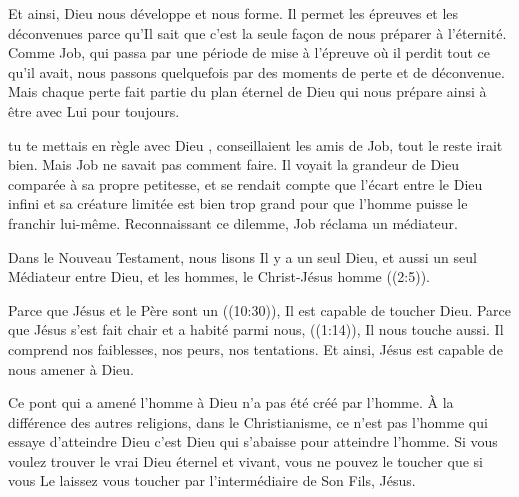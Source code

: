 Et ainsi, Dieu nous développe et nous forme.
 Il permet les épreuves et les déconvenues parce qu'Il sait
 que c'est la seule façon de nous préparer à l'éternité.
 Comme Job, qui passa par une période de mise à l'épreuve
 où il perdit tout ce qu'il avait, nous passons quelquefois
 par des moments de perte et de déconvenue.
 Mais chaque perte fait partie du plan éternel de Dieu
 qui nous prépare ainsi à être avec Lui pour toujours. 

\dvrule






 tu te mettais en règle avec Dieu \fg{},
 conseillaient les amis de Job, \og tout le reste irait bien. \fg{}
 Mais Job ne savait pas comment faire.
 Il voyait la grandeur de Dieu comparée à sa propre petitesse,
 et se rendait compte que l'écart entre le Dieu infini
 et sa créature limitée est bien trop grand pour que l'homme
 puisse le franchir lui-même.
 Reconnaissant ce dilemme, Job réclama un médiateur.

Dans le Nouveau Testament, nous lisons \og Il y a un seul Dieu,
 et aussi un seul Médiateur entre Dieu, et les hommes,
 le Christ-Jésus homme \fg{} ((2:5)).


Parce que Jésus et le Père sont un ((10:30)),
 Il est capable de toucher Dieu.
 Parce que Jésus \og s'est fait chair et a habité parmi nous, \fg{}
 ((1:14)), Il nous touche aussi.
 Il comprend nos faiblesses, nos peurs, nos tentations.
 Et ainsi, Jésus est capable de nous amener à Dieu.

Ce pont qui a amené l'homme à Dieu n'a pas été créé par l'homme.
 À la différence des autres religions, dans le Christianisme,
 ce n'est pas l'homme qui essaye d'atteindre Dieu
 \ocadr{}c'est Dieu qui s'abaisse pour atteindre l'homme.
 Si vous voulez trouver le vrai Dieu éternel et vivant,
 vous ne pouvez le toucher que si vous Le laissez vous toucher
 par l'intermédiaire de Son Fils, Jésus. 

